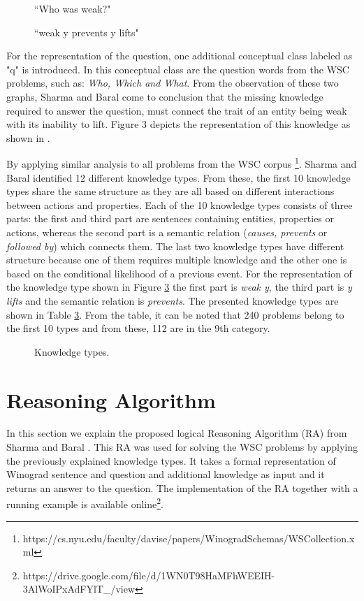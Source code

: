 \begin{figure} [h!]
	\centering
	
	\caption{\label{Graph12}``Who was weak?"}
\end{figure}

\begin{figure} [h!]
	\centering
	
	\caption{\label{Graph13} ``weak y prevents y lifts"}
\end{figure}

For the representation of the question, one additional conceptual class labeled as "q" is introduced. In this conceptual class are the question words from the WSC problems, such as: \textit{Who, Which and What}. 
From the observation of these two graphs, Sharma and Baral \cite{2018CommonsenseKT} come to conclusion that the missing knowledge required to answer the question, must connect the trait of an entity being weak with its inability to lift. Figure 3 depicts the representation of this knowledge as shown in \cite{2018CommonsenseKT}. 

By applying similar analysis to all problems from the WSC corpus \footnote{https://cs.nyu.edu/faculty/davise/papers/WinogradSchemas/WSCollection.xml}. Sharma and Baral \cite{2018CommonsenseKT} identified 12 different knowledge types. From these, the first 10 knowledge types share the same structure as they are all based on different interactions between actions and properties. Each of the 10 knowledge types consists of three parts: the first and third part are sentences containing entities, properties or actions, whereas the second part is a semantic relation (\textit{causes, prevents} or \textit{followed by}) which connects them. The last two knowledge types have different structure because one of them requires multiple knowledge and the other one is based on the conditional likelihood of a previous event. 
For the representation of the knowledge type shown in Figure \ref{Ktypes} the first part is \textit{weak y}, the third part is \textit{y lifts} and the semantic relation is \textit{prevents}. The presented knowledge types are shown in Table \ref{Ktypes}. From the table, it can be noted that 240 problems belong to the first 10 types and from these, 112 are in the 9th category. \\ 

\begin{figure} [h!]
	\centering
	
	\caption{\label{Ktypes} Knowledge types.}
\end{figure}
\pagebreak

\section{Reasoning Algorithm}
\label{RA}
In this section we explain the proposed logical Reasoning Algorithm (RA) from Sharma and Baral \cite{2018CommonsenseKT}. This RA was used for solving the WSC problems by applying the previously explained knowledge types. It takes a formal representation of Winograd sentence and question and additional knowledge as input and it returns an answer to the question. The implementation of the RA together with a running example is available online\footnote{https://drive.google.com/file/d/1WN0T98HaMFhWEEIH-3AlWoIPxAdFYlT\_/view}. 

